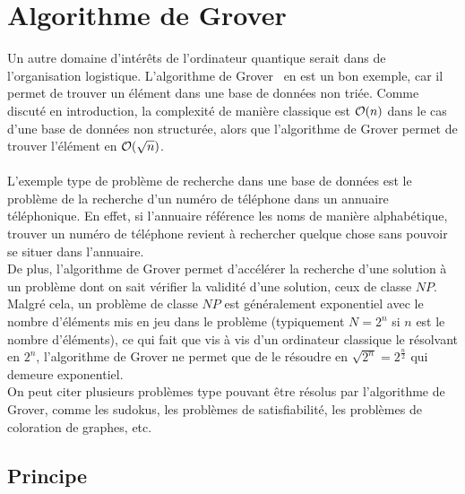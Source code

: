 \chapter{Algorithme de Grover}\label{ch:algorithme-de-grover}

Un autre domaine d'intérêts de l'ordinateur quantique serait dans de l'organisation logistique.
L'algorithme de Grover~\cite{grover-article, wiki:grover} en est un bon exemple, car il permet de trouver un élément dans une base
de données non triée.
Comme discuté en introduction, la complexité de manière classique est $\order{n}$ dans le cas
d'une base de données non structurée, alors que l'algorithme de Grover permet de trouver
l'élément en $\order{\sqrt{n}}$.\\ \\
L'exemple type de problème de recherche dans une base de données est le problème de la recherche
d'un numéro de téléphone dans un annuaire téléphonique.
En effet, si l'annuaire référence les noms de manière alphabétique, trouver un numéro de téléphone
revient à rechercher quelque chose sans pouvoir se situer dans l'annuaire.\\
De plus, l'algorithme de Grover permet d'accélérer la recherche d'une solution à un problème
dont on sait vérifier la validité d'une solution, ceux de classe $NP$\@.
Malgré cela, un problème de classe $NP$ est généralement exponentiel avec le nombre d'éléments
mis en jeu dans le problème (typiquement $N=2^n$ si $n$ est le nombre d'éléments), ce qui fait
que vis à vis d'un ordinateur classique le résolvant en $2^n$, l'algorithme de Grover ne permet
que de le résoudre en $\sqrt{2^n} = 2^{\frac{n}{2}}$ qui demeure exponentiel.\\
On peut citer plusieurs problèmes type pouvant être résolus par l'algorithme de Grover, comme
les sudokus, les problèmes de satisfiabilité, les problèmes de coloration de graphes, etc.

\section{Principe}\label{sec:principe2}

